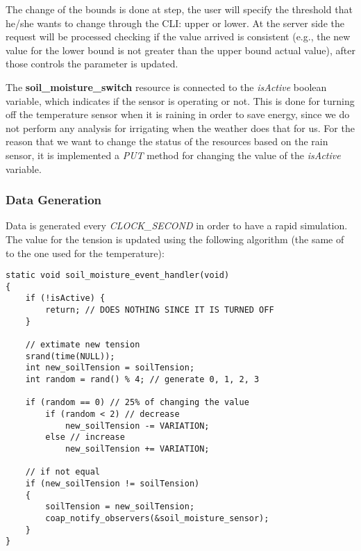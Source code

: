 The change of the bounds is done at step, the user will specify the threshold that he/she wants to change through the CLI: upper or lower. At the server side the request will be processed checking if the value arrived is consistent (e.g., the new value for the lower bound is not greater than the upper bound actual value), after those controls the parameter is updated.

The \textbf{soil\_moisture\_switch} resource is connected to the \textit{isActive} boolean variable, which indicates if the sensor is operating or not. This is done for turning off the temperature sensor when it is raining in order to save energy, since we do not perform any analysis for irrigating when the weather does that for us. For the reason that we want to change the status of the resources based on the rain sensor, it is implemented a \textit{PUT} method for changing the value of the \textit{isActive} variable.

\subsubsection{Data Generation}
Data is generated every \textit{CLOCK\_SECOND} in order to have a rapid simulation. The value for the tension is updated using the following algorithm (the same of to the one used for the temperature):

\begin{lstlisting}
static void soil_moisture_event_handler(void)
{
    if (!isActive) {
        return; // DOES NOTHING SINCE IT IS TURNED OFF
    }
    
    // extimate new tension
    srand(time(NULL));
    int new_soilTension = soilTension;
    int random = rand() % 4; // generate 0, 1, 2, 3
    
    if (random == 0) // 25% of changing the value
        if (random < 2) // decrease
            new_soilTension -= VARIATION;
        else // increase
            new_soilTension += VARIATION;

    // if not equal
    if (new_soilTension != soilTension)
    {
        soilTension = new_soilTension;
        coap_notify_observers(&soil_moisture_sensor);
    }
}
\end{lstlisting}



